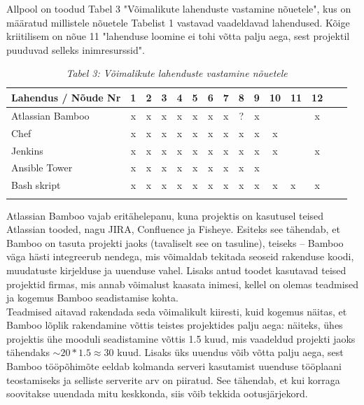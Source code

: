 \documentclass[12pt]{report}
\begin{document}
  Allpool on toodud Tabel 3 "Võimalikute lahenduste vastamine nõuetele", kus on määratud millistele nõuetele Tabelist 1 vastavad vaadeldavad lahendused. Kõige kriitilisem on nõue 11 "lahenduse loomine ei tohi võtta palju aega, sest projektil puuduvad selleks inimresurssid".
  
  \begin{table}[H] 
    \begin{tabular}{ |l|c|c|c|c|c|c|c|c|c|c V{4} c V{4} c| }
      \hline
      \textbf{Lahendus / Nõude Nr} & \textbf{1} & \textbf{2} & \textbf{3} & \textbf{4} & \textbf{5} & \textbf{6} & \textbf{7} & \textbf{8} & \textbf{9} & \textbf{10} & \textbf{11} & \textbf{12}\\
      \hline
      Atlassian Bamboo & x & x & x & x & x & x & x & ? & x & & & x\\
      \hline
      Chef & x & x & x & x & x & x & x & x & x & x & & \\
      \hline
      Jenkins & x & x & x & x & x & x & x & x & x & x & & x\\
      \hline
      Ansible Tower & x & x & x & x & x & x & x & x & x & & & \\
      \hline
      Bash skript & x & x & x & x & x & x & x & x & x & x & x & x\\
      \hline
    \end{tabular}
    \caption*{\textit{Tabel 3: Võimalikute lahenduste vastamine nõuetele}}
  \end{table}

  Atlassian Bamboo vajab eritähelepanu, kuna projektis on kasutusel teised Atlassian tooded, nagu JIRA, Confluence ja Fisheye. Esiteks see tähendab, et Bamboo on tasuta projekti jaoks (tavaliselt see on tasuline), teiseks \--- Bamboo väga hästi integreerub nendega, mis võimaldab tekitada seoseid rakenduse koodi, muudatuste kirjelduse ja uuenduse vahel. Lisaks antud toodet kasutavad teised projektid firmas, mis annab võimalust kaasata inimesi, kellel on olemas teadmised ja kogemus Bamboo seadistamise kohta.\\
  
  Teadmised aitavad rakendada seda võimalikult kiiresti, kuid kogemus näitas, et Bamboo lõplik rakendamine võttis teistes projektides palju aega: näiteks, ühes projektis ühe mooduli seadistamine võttis 1.5 kuud, mis vaadeldud projekti jaoks tähendaks $\sim20*1.5 \approx 30$ kuud. Lisaks üks uuendus võib võtta palju aega, sest Bamboo tööpõhimõte eeldab kolmanda serveri kasutamist uuenduse tööplaani teostamiseks ja selliste serverite arv on piiratud. See tähendab, et kui korraga soovitakse uuendada mitu keskkonda, siis võib tekkida ootusjärjekord.\\
  
\end{document}
